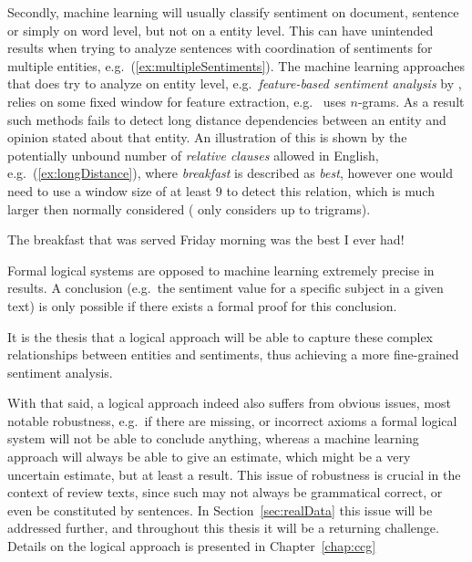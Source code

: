 Secondly, machine learning will usually classify sentiment on document, sentence or simply on word level, but not on a entity level. This can have unintended results when trying to analyze sentences with coordination of sentiments for multiple entities, e.g.\ (\ref{ex:multipleSentiments}). The machine learning approaches that does try to analyze on entity level, e.g.\ \emph{feature-based sentiment analysis} by \citeauthor{webDataMining} , relies on some fixed window for feature extraction, e.g.\ \citeauthor{webDataMining}  uses $n$-grams. As a result such methods fails to detect long distance dependencies between an entity and opinion stated about that entity. An illustration of this is shown by the potentially unbound number of \emph{relative clauses} allowed in English, e.g.\ (\ref{ex:longDistance}), where \emph{breakfast} is described as \emph{best}, however one would need to use a window size of at least $9$ to detect this relation, which is much larger then normally considered (\citeauthor{webDataMining} only considers up to trigrams).
\begin{numquote}
	The breakfast that was served Friday morning was the best I ever had!
	\label{ex:longDistance}
\end{numquote}

Formal logical systems are opposed to machine learning extremely precise in results. A conclusion (e.g.\ the sentiment value for a specific subject in a given text) is only possible if there exists a formal proof for this conclusion. 

\begin{thesis}
It is the thesis that a logical approach will be able to capture these complex relationships between entities and sentiments, thus achieving a more fine-grained sentiment analysis.
\end{thesis}
\vspace{-1em}
\done
\vspace{-1em}

With that said, a logical approach indeed also suffers from obvious issues, most notable robustness, e.g.\ if there are missing, or incorrect axioms a formal logical system will not be able to conclude anything, whereas a machine learning approach will always be able to give an estimate, which might be a very uncertain estimate, but at least a result. This issue of robustness is crucial in the context of review texts, since such may not always be grammatical correct, or even be constituted by sentences. In Section~\ref{sec:realData} this issue will be addressed further, and throughout this thesis it will be a returning challenge. Details on the logical approach is presented in Chapter~\ref{chap:ccg}	

